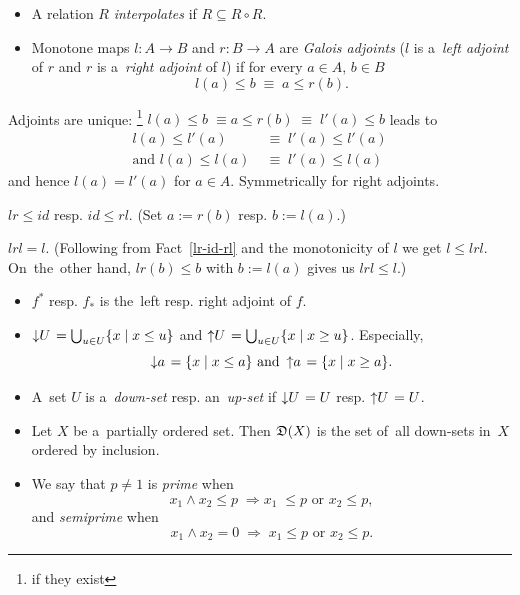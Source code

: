 \begin{itemize}
\item A relation $R$ \emph{interpolates} if $R \subseteq R \circ R$.

\item Monotone maps $l\colon A \to B$ and $r\colon B \to A$ are \emph{Galois
  adjoints\/} ($l$ is a~\emph{left adjoint\/} of $r$ and $r$ is a~\emph{right
  adjoint\/} of $l$) if for every $a\in A, \, b\in B$
  \[
    l(a) \le b \; \equiv \; a \le r(b).
  \]
\end{itemize}

\begin{rem}
  Adjoints are unique:\thinspace%
  \footnote{if they exist}
  $l(a) \le b \; \equiv a \le r(b) \; \equiv \; l'(a) \le b$ leads to
  \begin{align*}
    l(a) \le l'(a) \; &\equiv \; l'(a) \le l'(a) \\
    \text{and } l(a) \le l(a) \; &\equiv \; l'(a) \le l(a)
  \end{align*}
  and hence $l(a) = l'(a)$ for $a\in A$.
  Symmetrically for right adjoints.
\end{rem}

\begin{fact} \label{lr-id-rl}
  $lr \le id$ resp. $id \le rl$.
  (Set $a := r(b)$ resp. $b := l(a)$.)
\end{fact}

\begin{fact} \label{lrl=l}
  $lrl = l$.
  (Following from Fact~\ref{lr-id-rl} and the monotonicity of $l$ we get $l \le
   lrl$.
  On~the~other hand, $lr(b) \le b$ with $b := l(a)$ gives us $lrl \le l$.)
\end{fact}

\begin{itemize}
\item $f^*$ resp. $f_*$ is the~left resp. right adjoint of $f$.

\item $\left\downarrow U \right. = \bigcup_{u\in U} \{x \mid x \le u\}$ and
$\left\uparrow U \right. = \bigcup_{u\in U} \{x \mid x \ge u\}$.
Especially,
\[
  \left\downarrow a \right. = \{x \mid x \le a\} \text{ and } \left\uparrow a
  \right. = \{x \mid x \ge a\}.
\]

\item A~set $U$ is a~\emph{down-set\/} resp. an~\emph{up-set\/} if
$\left\downarrow U \right. = U$ resp. $\left\uparrow U \right. = U$.

\item Let $X$ be a~partially ordered set.
Then $\mathfrak{D}(X)$ is the set of~all down-sets in~$X$ ordered by inclusion.

\item We say that $p \ne 1$ is \emph{prime\/} when
\[
  x_1 \wedge x_2 \le p \; \Longrightarrow x_1 \;
  \le p \text{ or } x_2 \le p,
\]
and \emph{semiprime\/} when
\[
  x_1 \wedge x_2 = 0 \; \Longrightarrow \;
  x_1 \le p \text{ or } x_2 \le p.
\]
\end{itemize}

